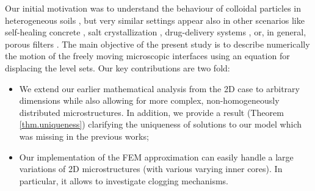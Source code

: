 \documentclass[reqno, 11pt]{amsart}
\numberwithin{equation}{section}
\begin{document}










Our initial motivation was to understand the behaviour of colloidal particles in heterogeneous soils \cite{Krehel,Icardi, Chen}, but very  similar settings appear also in other scenarios like self-healing concrete \cite{Etelvina}, salt crystallization \cite{Bologna}, 
drug-delivery systems
\cite{drug, Giulia}, or, in general,  porous filters 
\cite{Bruna_JFM}. The main objective of the present study is to describe numerically the motion of the freely moving microscopic interfaces using an equation for displacing the level sets.
Our key contributions are two fold:
\begin{itemize}
\item We extend our earlier mathematical analysis from the 2D case to arbitrary dimensions while also allowing for more complex, non-homogeneously distributed microstructures.
In addition, we provide a result (Theorem \ref{thm.uniqueness}) clarifying the  uniqueness of solutions to our model  which was missing in the previous works;
\item Our implementation of the FEM approximation can easily handle a large variations of 2D microstructures (with various varying inner cores). In particular, it allows to investigate clogging mechanisms. 
\end{itemize}
\end{document}
